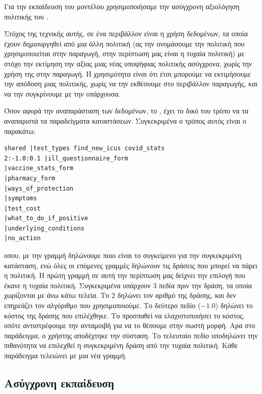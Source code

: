 Για την εκπαίδευση του μοντέλου χρησιμοποιήσαμε την ασύγχρονη αξιολόγηση πολιτικής  του .

Στόχος της τεχνικής αυτής, σε ένα περιβάλλον  είναι η χρήση δεδομένων, τα οποία έχουν δημιουργηθεί από μια άλλη πολιτική (ας την ονομάσουμε την πολιτική που χρησιμοποιείται στην παραγωγή, στην περίπτωση μας είναι η τυχαία πολιτική) με στόχο την εκτίμηση την αξίας μιας νέας υποψήφιας πολιτικής ασύγχρονα, χωρίς την χρήση της στην παραγωγή. Η χρησιμότητα είναι ότι έτσι μπορούμε να εκτιμήσουμε την απόδοση μιας πολιτικής, χωρίς να την εκθέσουμε στο περιβάλλον παραγωγής, και να την συγκρίνουμε με την υπάρχουσα.

Όσον αφορά την αναπαράσταση των δεδομένων, το , έχει το δικό του τρόπο να τα αναπαριστά τα παραδείγματα καταστάσεων. Συγκεκριμένα ο τρόπος αυτός είναι ο παρακάτω:

\begin{otherlanguage}{english}
    \begin{lstlisting}
shared |test_types find_new_icus covid_stats
2:-1.0:0.1 |ill_questionnaire_form
|vaccine_stats_form
|pharmacy_form
|ways_of_protection
|symptoms
|test_cost
|what_to_do_if_positive
|underlying_conditions
|no_action
    \end{lstlisting}
\end{otherlanguage}

οπου, με την γραμμή  δηλώνουμε ποιο είναι το συγκείμενο για την συγκεκριμένη κατάσταση, ενώ όλες οι επόμενες γραμμές δηλώνουν τις δράσεις που μπορεί να πάρει η πολιτική. Η πρώτη γραμμή σε αυτή την περίπτωση μας δείχνει την επιλογή που έκανε η τυχαία πολιτική. Συγκεκριμένα υπάρχουν 3 πεδία πριν την δράση, τα οποία χωρίζονται με άνω κάτω τελεία. Το $2$ δηλώνει τον αριθμό της δράσης, και δεν επηρεάζει τον αλγόριθμο που χρησιμοποιούμε. Το δεύτερο πεδίο ($-1.0$) δηλώνει το κόστος της δράσης που επιλέχθηκε. Το  προσπαθεί να ελαχιστοποιήσει το κόστος, οπότε αντιστρέφουμε την ανταμοιβή για να το θέσουμε στην σωστή μορφή. Αρα στο παράδειγμα, ο χρήστης αποδέχτηκε την σύσταση. Το τελευταίο πεδίο υποδηλώνει την πιθανότητα να επιλεχθεί η συγκεκριμένη δράση από την τυχαία πολιτική.  Κάθε παράδειγμα τελειώνει με μια νέα γραμμή.

\subsection{Ασύγχρονη εκπαίδευση}

